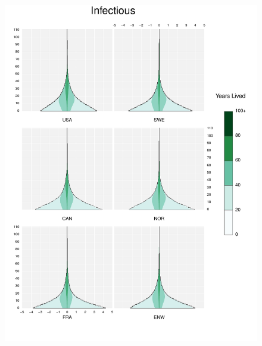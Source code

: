 \documentclass{article}
\begin{document}
\begin{appendices}
\begin{figure}
\includegraphics[scale=.8]{Figures/Causes/DyxInfectious.pdf}
\end{figure}
\begin{figure}
\centering

\end{figure}
\end{appendices}
\end{document}
